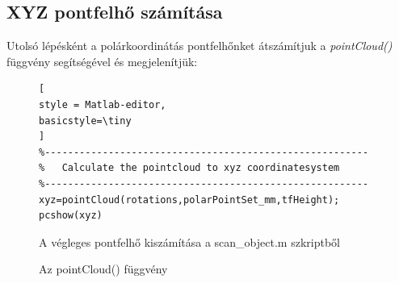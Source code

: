 \documentclass[12pt,a4paper]{article}
\begin{document}
\subsection{XYZ pontfelhő számítása}
Utolsó lépésként a polárkoordinátás pontfelhőnket átszámítjuk a \textit{pointCloud()} függvény segítségével és megjelenítjük:
\begin{figure}[h!]
\centering
\begin{lstlisting}[
style = Matlab-editor,
basicstyle=\tiny
]
%--------------------------------------------------------
%   Calculate the pointcloud to xyz coordinatesystem
%--------------------------------------------------------
xyz=pointCloud(rotations,polarPointSet_mm,tfHeight);
pcshow(xyz)
\end{lstlisting}
\caption{A végleges pontfelhő kiszámítása a scan\_object.m szkriptből}
\end{figure}
\begin{figure}[h!]
	\centering
	
	\caption{Az pointCloud() függvény}
\end{figure}

\end{document}
